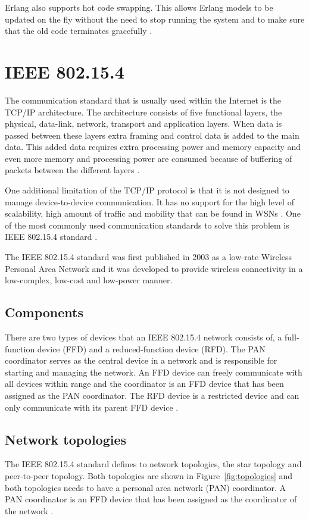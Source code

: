 Erlang also supports hot code swapping. This allows Erlang models to be updated on the fly without the need to stop running the system and to make sure that the old code terminates gracefully \citep{sivieri2012erlang}.

\section{IEEE 802.15.4}
The communication standard that is usually used within the Internet is the TCP/IP architecture. The architecture consists of five functional layers, the physical, data-link, network, transport and application layers. When data is passed between these layers extra framing and control data is added to the main data. This added data requires extra processing power and memory capacity and even more memory and processing power are consumed because of buffering of packets between the different layers \citep{BELLO201752}.

One additional limitation of the TCP/IP protocol is that it is not designed to manage device-to-device communication. It has no support for the high level of scalability, high amount of traffic and mobility that can be found in WSNs \citep{BELLO201752}. One of the most commonly used communication standards to solve this problem is IEEE 802.15.4 standard \citep{yang2014internet}.

The IEEE 802.15.4 standard was first published in 2003 as a low-rate Wireless Personal Area Network and it was developed to provide wireless connectivity in a low-complex, low-cost and low-power manner. 

\subsection{Components}
There are two types of devices that an IEEE 802.15.4 network consists of, a full-function device (FFD) and a reduced-function device (RFD).  The PAN coordinator serves as the central device in a network and is responsible for starting and managing the network. An FFD device can freely communicate with all devices within range and the coordinator is an FFD device that has been assigned as the PAN coordinator. The RFD device is a restricted device and can only communicate with its parent FFD device \citep{yang2014internet}.

\subsection{Network topologies}
The IEEE 802.15.4 standard defines to network topologies, the star topology and peer-to-peer topology. Both topologies are shown in Figure~\ref{fig:topologies} and both topologies needs to have a personal area network (PAN) coordinator. A PAN coordinator is an FFD device that has been assigned as the coordinator of the network \citep{kohvakka2006performance}.

